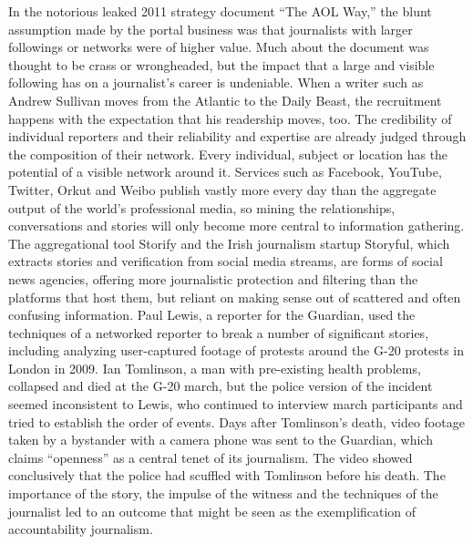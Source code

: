 In the notorious leaked 2011 strategy document ``The AOL Way,'' the blunt
assumption made by the portal business was that journalists with larger followings
or networks were of higher value. Much about the document was thought
to be crass or wrongheaded, but the impact that a large and visible following has
on a journalist’s career is undeniable. When a writer such as Andrew Sullivan
moves from the Atlantic to the Daily Beast, the recruitment happens with the
expectation that his readership moves, too. The credibility of individual reporters
and their reliability and expertise are already judged through the composition of
their network.
Every individual, subject or location has the potential of a visible network around
it. Services such as Facebook, YouTube, Twitter, Orkut and Weibo publish vastly
more every day than the aggregate output of the world’s professional media, so
mining the relationships, conversations and stories will only become more central
to information gathering. The aggregational tool Storify and the Irish journalism
startup Storyful, which extracts stories and verification from social media streams,
are forms of social news agencies, offering more journalistic protection and filtering
than the platforms that host them, but reliant on making sense out of scattered
and often confusing information.
Paul Lewis, a reporter for the Guardian, used the techniques of a networked
reporter to break a number of significant stories, including analyzing user-captured
footage of protests around the G-20 protests in London in 2009. Ian Tomlinson,
a man with pre-existing health problems, collapsed and died at the G-20
march, but the police version of the incident seemed inconsistent to Lewis, who
continued to interview march participants and tried to establish the order of
events. Days after Tomlinson’s death, video footage taken by a bystander with a
camera phone was sent to the Guardian, which claims ``openness'' as a central
tenet of its journalism. The video showed conclusively that the police had scuffled
with Tomlinson before his death. The importance of the story, the impulse of
the witness and the techniques of the journalist led to an outcome that might be
seen as the exemplification of accountability journalism.


